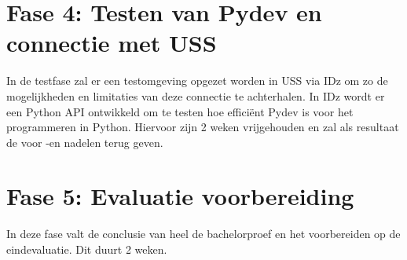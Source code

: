 \section{Fase 4: Testen van Pydev en connectie met USS}
\label{sec:m-verdere-configuratie}
In de testfase zal er een testomgeving opgezet worden in USS via IDz om zo de mogelijkheden en limitaties van deze connectie te achterhalen. In IDz wordt er een Python API ontwikkeld om te testen hoe efficiënt Pydev is voor het programmeren in Python. Hiervoor zijn 2 weken vrijgehouden en zal als resultaat de voor -en nadelen terug geven. 
%    

\section{Fase 5: Evaluatie voorbereiding}
\label{sec:m-evaluatie-voorbereiding}
In deze fase valt de conclusie van heel de bachelorproef en het voorbereiden op de eindevaluatie. Dit duurt 2 weken.


